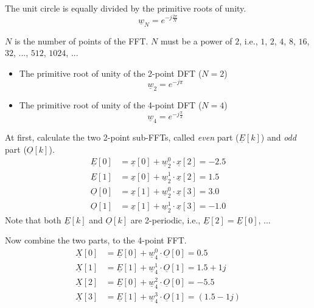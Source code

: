 \begin{solution}
\begin{tasks}
		\task
		The unit circle is equally divided by the primitive roots of unity.
		\begin{equation}
			\underline{w}_N = e^{- j \frac{2 \pi}{N}}
		\end{equation}
		
		$N$ is the number of points of the FFT. $N$ must be a power of $2$, i.e., $1$, $2$, $4$, $8$, $16$, $32$, ..., $512$, $1024$, ...
		
		\begin{itemize}
			\item The primitive root of unity of the 2-point DFT ($N = 2$)
			\begin{equation*}
				\underline{w}_2 = e^{- j \pi}
			\end{equation*}
			\item The primitive root of unity of the 4-point DFT ($N = 4$)
			\begin{equation*}
				\underline{w}_4 = e^{- j \frac{\pi}{2}}
			\end{equation*}
		\end{itemize}
	
		\task
		At first, calculate the two 2-point sub-FFTs, called \emph{even} part ($\underline{E}[k]$) and \emph{odd} part ($\underline{O}[k]$).
		\begin{equation*}
			\begin{split}
				\underline{E}[0] &= \underline{x}[0] + \underline{w}_2^{0} \cdot \underline{x}[2] = -2.5 \\
				\underline{E}[1] &= \underline{x}[0] + \underline{w}_2^{1} \cdot \underline{x}[2] = 1.5 \\
				\underline{O}[0] &= \underline{x}[1] + \underline{w}_2^{0} \cdot \underline{x}[3] = 3.0 \\
				\underline{O}[1] &= \underline{x}[1] + \underline{w}_2^{1} \cdot \underline{x}[3] = -1.0
			\end{split}
		\end{equation*}
		Note that both $\underline{E}[k]$ and $\underline{O}[k]$ are 2-periodic, i.e., $\underline{E}[2] = \underline{E}[0]$, ...
		
		Now combine the two parts, to the 4-point FFT.
		\begin{equation*}
			\begin{split}
				\underline{X}[0] &= \underline{E}[0] + \underline{w}_4^{0} \cdot \underline{O}[0] = 0.5 \\
				\underline{X}[1] &= \underline{E}[1] + \underline{w}_4^{1} \cdot \underline{O}[1] = 1.5+1j \\
				\underline{X}[2] &= \underline{E}[0] + \underline{w}_4^{2} \cdot \underline{O}[0] = -5.5 \\
				\underline{X}[3] &= \underline{E}[1] + \underline{w}_4^{3} \cdot \underline{O}[1] = (1.5-1j)
			\end{split}
		\end{equation*}
		

\end{tasks}
\end{solution}
